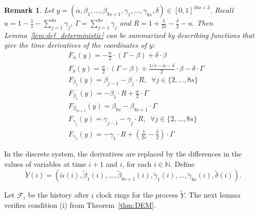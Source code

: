 \documentclass[a4paper,12pt]{article}
\newtheorem{remark}{Remark}
\begin{document}
\begin{remark} \label{rmk:det_derivatives_map}
	Let $y = \left(\alpha, \beta_1, \ldots, \beta_{8s+1}, \gamma_1, \ldots, \gamma_{8s}, \delta\right) \in [0,1]^{16s+3}.$
	Recall $u = 1 - \frac{1}{s} - \sum_{j=1}^{8s} \gamma_j$, $\Gamma = \sum_{j=1}^{8s} \gamma_{j}$ and $R = 1 + \frac{1}{2s} - \frac{\delta}{2} - u.$
	Then Lemma~\ref{lem:def_deterministic} can be summarized by describing functions that give the time derivatives of the coordinates of $y$:
	\begin{align}
	& F_{\alpha}(y) = - \frac{\alpha}{2} \cdot \left(\Gamma - \beta \right) + \delta \cdot \beta \label{F_alpha} \\
	& F_{\delta}(y) = \frac{\alpha}{2} \cdot \left(\Gamma - \beta \right) + \frac{1/s - \alpha - \delta}{2} \cdot \beta - \delta \cdot \Gamma \\
	\label{F_beta_j}
	& F_{\beta_j}(y) = \beta_{j-1} - \beta_j \cdot R, \; \; \forall j \in\{2, \ldots, 8s\}\\
	\label{F_beta_1}
&	F_{\beta_1}(y) = -\beta_1 \cdot R + \frac{\alpha}{2} \cdot \Gamma \\
	\label{F_beta_8s1}
	& F_{\beta_{8s+1}}(y) = \beta_{8s} - \beta_{8s+1}\cdot \Gamma \\
	& F_{\gamma_j}(y) = \gamma_{j-1} - \gamma_j \cdot R, \; \; \forall j \in \{2, \ldots, 8s\} \label{F_gamma_j} \\
	& F_{\gamma_1}(y) = - \gamma_1 \cdot R + \left(\frac{1}{2s} - \frac{\delta}{2}\right) \cdot \Gamma \label{F_gamma_1}
	\end{align}
\end{remark}

In the discrete system, the derivatives are replaced by the differences in the values of variables at time $i+1$ and $i$, for each $i \in \mathbb{N}$.
Define $$\widetilde{{Y}}(i) = \left(\widetilde{\alpha}(i), \widetilde{\beta}_1(i), \ldots,  \widetilde{\beta}_{8s+1}(i),  \widetilde{\gamma}_1(i), \ldots, \widetilde{\gamma}_{8s}(i),\widetilde{\delta}(i)\right).$$

Let $\mathcal{F}_i$ be the history after $i$ clock rings for the process $\widetilde{Y}$. The next lemma verifies condition (i) from Theorem~\ref{thm:DEM}.
\end{document}
